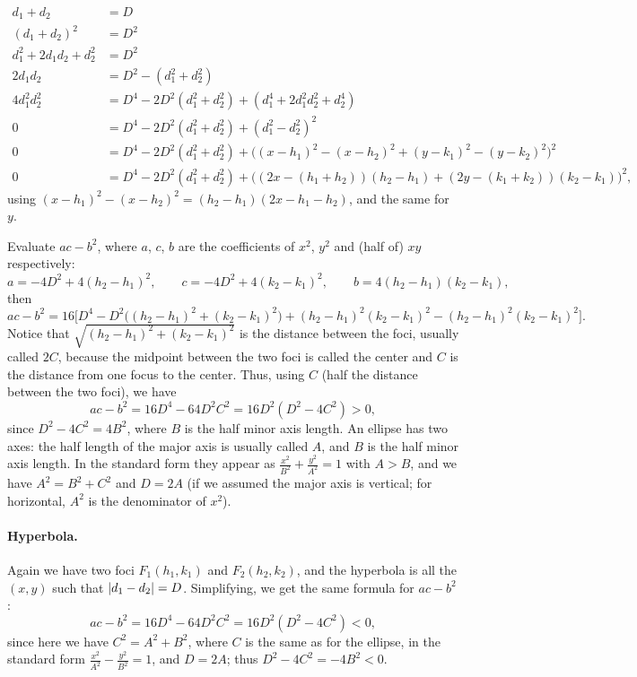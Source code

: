 \begin{calc}
\[
\begin{aligned}
d_1 + d_2 &= D \\
(d_1 + d_2)^2 &= D^2 \\
d_1^2 + 2d_1d_2 + d_2^2 &= D^2 \\
2d_1d_2 &= D^2 - (d_1^2 + d_2^2) \\
4d_1^2d_2^2 &= D^4 - 2D^2(d_1^2 + d_2^2) + (d_1^4 + 2d_1^2d_2^2 + d_2^4) \\
0 &= D^4 - 2D^2(d_1^2 + d_2^2) + (d_1^2 - d_2^2)^2 \\
0 &= D^4 - 2D^2(d_1^2 + d_2^2) + \big((x-h_1)^2 - (x-h_2)^2 + (y-k_1)^2 - (y-k_2)^2\big)^2 \\
0 &= D^4 - 2D^2(d_1^2 + d_2^2) + \big((2x - (h_1 + h_2))(h_2 - h_1) + (2y - (k_1 + k_2))(k_2 - k_1)\big)^2 ,
\end{aligned}
\]
using $(x-h_1)^2 - (x-h_2)^2 = (h_2 - h_1)(2x - h_1 - h_2)$, and the same for $y$.
\end{calc}

Evaluate $ac - b^2$, where $a$, $c$, $b$ are the coefficients of $x^2$, $y^2$ and (half of) $xy$ respectively:
\[
a = -4D^2 + 4(h_2 - h_1)^2, \qquad
c = -4D^2 + 4(k_2 - k_1)^2, \qquad
b = 4(h_2 - h_1)(k_2 - k_1),
\]
then
\[
ac - b^2 = 16\Big[D^4 - D^2\big((h_2 - h_1)^2 + (k_2 - k_1)^2\big) + (h_2 - h_1)^2(k_2 - k_1)^2 - (h_2 - h_1)^2(k_2 - k_1)^2\Big].
\]
Notice that $\sqrt{(h_2 - h_1)^2 + (k_2 - k_1)^2}$ is the distance between the foci, usually called $2C$, because the midpoint between the two foci is called the center and $C$ is the distance from one focus to the center. Thus, using $C$ (half the distance between the two foci), we have
\[
ac - b^2 = 16D^4 - 64D^2C^2 = 16D^2(D^2 - 4C^2) > 0,
\]
since $D^2 - 4C^2 = 4B^2$, where $B$ is the half minor axis length. An ellipse has two axes: the half length of the major axis is usually called $A$, and $B$ is the half minor axis length. In the standard form they appear as $\frac{x^2}{B^2} + \frac{y^2}{A^2} = 1$ with $A > B$, and we have $A^2 = B^2 + C^2$ and $D = 2A$ (if we assumed the major axis is vertical; for horizontal, $A^2$ is the denominator of $x^2$).

\paragraph{Hyperbola.} Again we have two foci $F_1(h_1,k_1)$ and $F_2(h_2,k_2)$, and the hyperbola is all the $(x,y)$ such that $\left\lvert d_1 - d_2\right\rvert = D$. Simplifying, we get the same formula for $ac - b^2$:
\[
ac - b^2 = 16D^4 - 64D^2C^2 = 16D^2(D^2 - 4C^2) < 0,
\]
since here we have $C^2 = A^2 + B^2$, where $C$ is the same as for the ellipse, in the standard form $\frac{x^2}{A^2} - \frac{y^2}{B^2} = 1$, and $D = 2A$; thus $D^2 - 4C^2 = -4B^2 < 0$.

